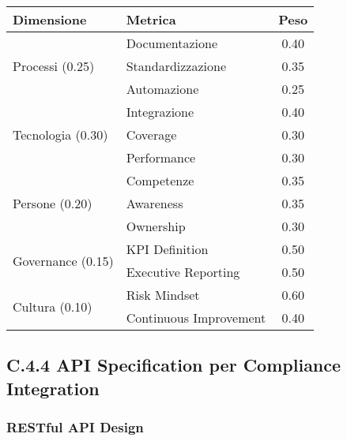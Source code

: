 \begin{table}[htbp]
\centering
\begin{tabular}{llc}
\toprule
\textbf{Dimensione} & \textbf{Metrica} & \textbf{Peso} \\
\midrule
\multirow{3}{*}{Processi (0.25)} & Documentazione & 0.40 \\
 & Standardizzazione & 0.35 \\
 & Automazione & 0.25 \\
\midrule
\multirow{3}{*}{Tecnologia (0.30)} & Integrazione & 0.40 \\
 & Coverage & 0.30 \\
 & Performance & 0.30 \\
\midrule
\multirow{3}{*}{Persone (0.20)} & Competenze & 0.35 \\
 & Awareness & 0.35 \\
 & Ownership & 0.30 \\
\midrule
\multirow{2}{*}{Governance (0.15)} & KPI Definition & 0.50 \\
 & Executive Reporting & 0.50 \\
\midrule
\multirow{2}{*}{Cultura (0.10)} & Risk Mindset & 0.60 \\
 & Continuous Improvement & 0.40 \\
\bottomrule
\end{tabular}
\end{table}

\subsection{C.4.4 API Specification per Compliance Integration}

\subsubsection{RESTful API Design}

